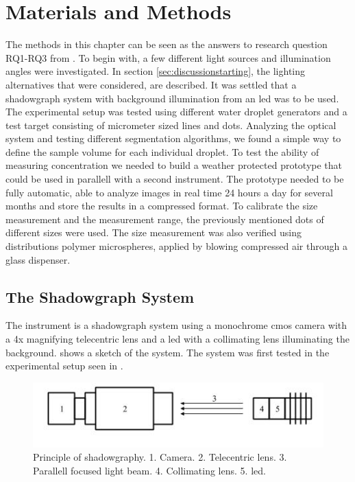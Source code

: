 
\chapter{Materials and Methods}
\label{chap:methods}

The methods in this chapter can be seen as the answers to research question RQ1-RQ3 from . To begin with, a few different light sources and illumination angles were investigated. In section \ref{sec:discussionstarting}, the lighting alternatives that were considered, are described. It was settled that a shadowgraph system with background illumination from an \gls{led} was to be used. The experimental setup was tested using different water droplet generators and a test target consisting of micrometer sized lines and dots. Analyzing the optical system and testing different segmentation algorithms, we found a simple way to define the sample volume for each individual droplet. To test the ability of measuring concentration we needed to build a weather protected prototype that could be used in parallell with a second instrument. The prototype needed to be fully automatic, able to analyze images in real time 24 hours a day for several months and store the results in a compressed format. To calibrate the size measurement and the measurement range, the previously mentioned dots of different sizes were used. The size measurement was also verified using distributions polymer microspheres, applied by blowing compressed air through a glass dispenser.

\section{The Shadowgraph System}

The instrument is a shadowgraph system using a monochrome \gls{cmos} camera with a 4x magnifying telecentric lens and a \gls{led} with a collimating lens illuminating the background.  shows a sketch of the system. The system was first tested in the experimental setup seen in . 

\begin{figure}[ht]
\centering\includegraphics[width=0.75\linewidth]{./figures/shadowprinc.jpg}
\caption{Principle of shadowgraphy. 1. Camera. 2. Telecentric lens. 3. Parallell focused light beam. 4. Collimating lens. 5. \gls{led}.}
\label{fig:shadowprinc}
\end{figure}

